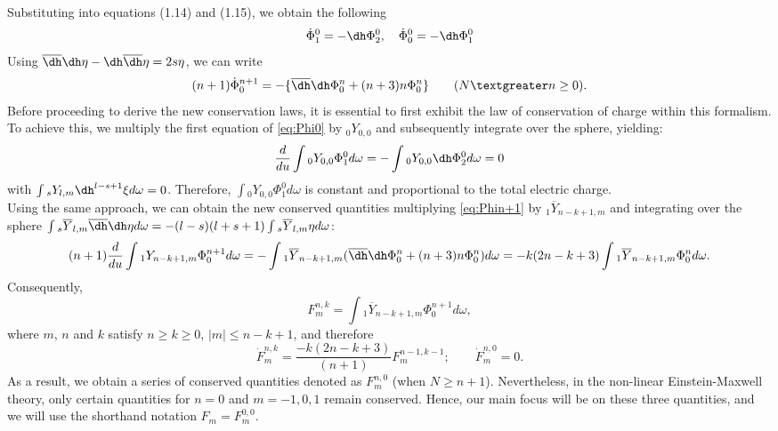 Substituting into equations (1.14) and (1.15), we obtain the following
\begin{equation}\label{eq:Phi0}
  \dot{\Phi}_{1}^{0} = -\dh\Phi_{2}^{0}, \quad \dot{\Phi}_{0}^{0} = -\dh \Phi_{1}^{0}
\end{equation}
Using  $\overline{\dh}\dh \eta - \dh \overline{\dh} \eta = 2s\eta$, we can write
\begin{equation}\label{eq:Phin+1}
  (n + 1)\dot{\Phi}_{0}^{n+1} = -\{\overline{\dh}\dh \Phi_{0}^{n} + (n+3)n\Phi_{0}^{n}\} \qquad (N \textgreater n \geq 0).
\end{equation}
Before proceeding to derive the new conservation laws, it is essential to first exhibit the law of conservation of charge within this formalism. To achieve this, we multiply the first equation of \eqref{eq:Phi0} by $_{0}Y_{0,0}$ and subsequently integrate over the sphere, yielding:
\begin{equation}\label{eq:YPhi0}
  \frac{d}{du} \int {_{0}Y_{0,0}\Phi_{1}^{0} d\omega} = - \int {_{0}Y_{0,0}\dh \Phi_{2}^{0} d\omega} = 0
\end{equation}
with $\int{_{s}Y_{l,m}\dh^{l-s+1}\xi d\omega} = 0$. Therefore, $\int {_{0}Y_{0,0}\Phi_{1}^{0} d\omega}$ is constant and proportional to the total electric charge.\\
Using the same approach, we can obtain the new conserved quantities multiplying \eqref{eq:Phin+1} by $_{1}\overline{Y}_{n-k+1,m}$ and integrating over the sphere $\int {_{s}\overline{Y}_{l,m}\overline{\dh}\dh \eta d \omega} = -(l-s)(l+s+1) \int{_{s}\overline{Y}_{l,m}\eta d\omega}$:
\begin{equation}\label{eq:Eleccharge}
  (n+1)\frac{d}{du}\int{_{1}Y_{n-k+1,m}\Phi_{0}^{n+1} d\omega} = - \int{_{1}\overline{Y}_{n-k+1,m}(\overline{\dh}\dh \Phi_{0}^{n}+(n+3)n\Phi_{0}^{n})d\omega} = -k(2n-k+3)\int{_{1}\overline{Y}_{n-k+1,m}\Phi_{0}^{n} d\omega}.
\end{equation}
Consequently,
\begin{equation}\label{eq:F}
  F_{m}^{n,k} = \int{_{1}\overline{Y}_{n-k+1,m}\Phi_{0}^{n+1} d\omega},
\end{equation}
where $m$, $n$ and $k$ satisfy $n \geq k \geq 0$, $|m| \leq n-k+1$, and therefore 
\begin{equation}\label{eq:Fdot}
  \dot{F}_{m}^{n,k} = \frac{-k(2n-k+3)}{(n+1)}F_{m}^{n-1,k-1} ; \qquad \dot{F}_{m}^{n,0} = 0.
\end{equation}
As a result, we obtain a series of conserved quantities denoted as $F_{m}^{n,0}$ (when $N \geq n+1$). Nevertheless, in the non-linear Einstein-Maxwell theory, only certain quantities for $n = 0$ and $m = -1, 0, 1$ remain conserved. Hence, our main focus will be on these three quantities, and we will use the shorthand notation $F_{m} = F_{m}^{0,0}$.\\
